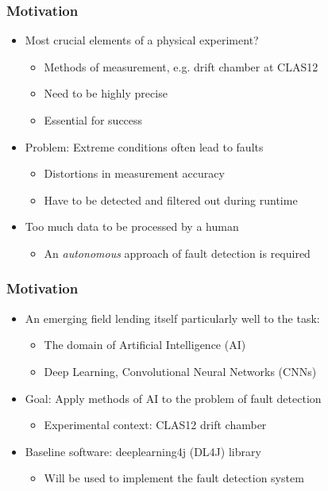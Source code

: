 \begin{frame}
  \frametitle{Motivation}
  \begin{itemize}
    \item Most crucial elements of a physical experiment?
      \begin{itemize}
        \item Methods of measurement, e.g. drift chamber at CLAS12
        \item Need to be highly precise
        \item Essential for success
      \end{itemize}
    \item Problem: Extreme conditions often lead to faults
      \begin{itemize}
        \item Distortions in measurement accuracy
        \item Have to be detected and filtered out during runtime
      \end{itemize}
    \item Too much data to be processed by a human
      \begin{itemize}
        \item An \textit{autonomous} approach of fault detection is required
      \end{itemize}
  \end{itemize}
\end{frame}

\begin{frame}
  \frametitle{Motivation}
  \begin{itemize}
    \item An emerging field lending itself particularly well to the task:
      \begin{itemize}
        \item The domain of Artificial Intelligence (AI)
        \item Deep Learning, Convolutional Neural Networks (CNNs)
      \end{itemize}
    \item Goal: Apply methods of AI to the problem of fault detection
      \begin{itemize}
        \item Experimental context: CLAS12 drift chamber
      \end{itemize}
    \item Baseline software: deeplearning4j (DL4J) library
      \begin{itemize}
        \item Will be used to implement the fault detection system
      \end{itemize}
  \end{itemize}
\end{frame}

